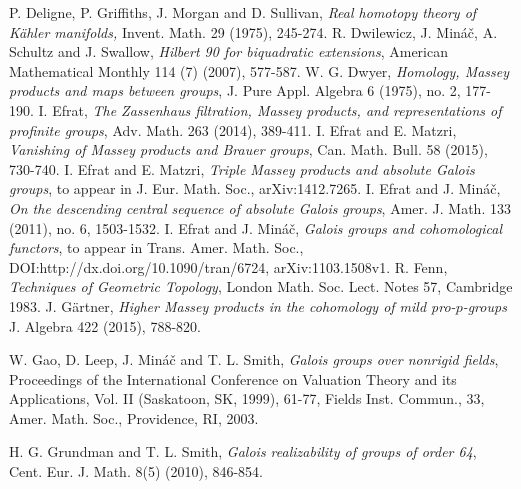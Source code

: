 \documentclass[12pt,leqno]{amsart}
\theoremstyle{plain}
\theoremstyle{definition}
\begin{document}
\begin{thebibliography}{999999999}
 P. Deligne, P. Griffiths, J. Morgan and D. Sullivan, {\it Real homotopy theory of K\"{a}hler manifolds,} Invent. Math. 29 (1975), 245-274. 
 R. Dwilewicz, J. Min\'a\v{c}, A. Schultz and J. Swallow, {\it Hilbert 90 for biquadratic extensions}, American Mathematical Monthly 114 (7) (2007), 577-587.
 W. G. Dwyer, {\it Homology, Massey products and maps between groups}, J. Pure Appl. Algebra 6 (1975), no. 2, 177-190.
 I. Efrat, {\it The Zassenhaus filtration, Massey products, and representations of profinite groups}, Adv. Math. 263 (2014), 389-411.
 I. Efrat and E. Matzri, {\it Vanishing of Massey products and Brauer groups}, Can. Math. Bull. 58 (2015), 730-740.
 I. Efrat and E. Matzri, {\it Triple Massey products and absolute Galois groups}, to appear in J. Eur. Math. Soc., arXiv:1412.7265.
 I. Efrat and J. Min\'a\v{c},  {\it On the descending central sequence of absolute Galois groups}, Amer. J. Math. 133 (2011), no. 6, 1503-1532.
 I. Efrat and J. Min\'a\v{c}, {\it  Galois groups and cohomological functors}, to appear in Trans. Amer.  Math. Soc., DOI:http://dx.doi.org/10.1090/tran/6724,
  arXiv:1103.1508v1.
 R. Fenn, {\it Techniques of Geometric Topology}, London Math. Soc. Lect. Notes 57, Cambridge 1983.
 J. G\"{a}rtner, {\it Higher Massey products in the cohomology of mild pro-$p$-groups} J. Algebra 422 (2015), 788-820.


 W. Gao, D. Leep, J. Min\'a\v{c} and T. L. Smith, {\it Galois groups over nonrigid fields}, Proceedings of the International Conference on Valuation Theory and its Applications, Vol. II (Saskatoon, SK, 1999), 61-77, Fields Inst. Commun., 33, Amer. Math. Soc., Providence, RI, 2003.

 H. G. Grundman and T. L. Smith, {\it Galois realizability of groups of order 64}, Cent. Eur. J. Math. 8(5) (2010), 846-854. 


\end{thebibliography}
\end{document}
